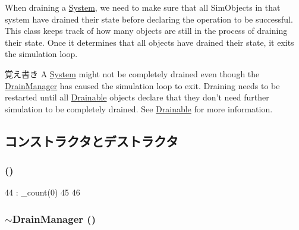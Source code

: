 When draining a \hyperlink{classSystem}{System}, we need to make sure that all SimObjects in that system have drained their state before declaring the operation to be successful. This class keeps track of how many objects are still in the process of draining their state. Once it determines that all objects have drained their state, it exits the simulation loop.

\begin{DoxyNote}{覚え書き}
A \hyperlink{classSystem}{System} might not be completely drained even though the \hyperlink{classDrainManager}{DrainManager} has caused the simulation loop to exit. Draining needs to be restarted until all \hyperlink{classDrainable}{Drainable} objects declare that they don't need further simulation to be completely drained. See \hyperlink{classDrainable}{Drainable} for more information. 
\end{DoxyNote}


\subsection{コンストラクタとデストラクタ}
\hypertarget{classDrainManager_a506f93f39ee1dafe8f3c8c2a52750690}{
\subsubsection[{DrainManager}]{ ()}}
\label{classDrainManager_a506f93f39ee1dafe8f3c8c2a52750690}



\begin{DoxyCode}
44     : _count(0)
45 {
46 }
\end{DoxyCode}
\hypertarget{classDrainManager_a62f756d150df3c855b036af9c2e16d51}{
\subsubsection[{$\sim$DrainManager}]{\setlength{\rightskip}{0pt plus 5cm}$\sim${\bf DrainManager} ()}}
\label{classDrainManager_a62f756d150df3c855b036af9c2e16d51}



